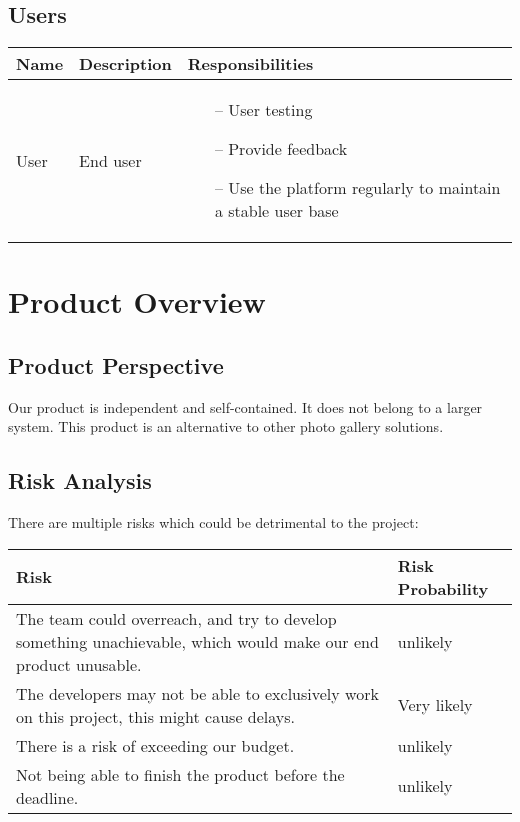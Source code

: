 \documentclass{article}
\begin{document}
\subsection{Users}
\begin{tabularx}{1.0\textwidth} { 
  | >{\raggedright\arraybackslash}X 
  | >{\raggedright\arraybackslash}X
  | >{\raggedright\arraybackslash}X | }
    \hline
    \rowcolor{lightgray} Name & Description & Responsibilities \\
    \hline
    User & End user & \begin{itemize}
        \item[--] User testing
        \item[--] Provide feedback
        \item[--] Use the platform regularly to maintain a stable user base
    \end{itemize}{} \\
    \hline
\end{tabularx}


\section{Product Overview}
\subsection{Product Perspective}
Our product is independent and self-contained. It does not belong to a larger system. This product is an alternative to other photo gallery solutions. 
\subsection{Risk Analysis}
There are multiple risks which could be detrimental to the project: 


\begin{tabularx}{1.0\textwidth} { 
  | >{\raggedright\arraybackslash}X 
  | >{\raggedright\arraybackslash}X | }
    \hline
    \rowcolor{lightgray} Risk & Risk Probability \\
    \hline
    The team could overreach, and try to develop something unachievable, which would make our end product unusable. & unlikely \\
    \hline
    The developers may not be able to exclusively work on this project, this might cause delays. & Very likely \\
    \hline
    There is a risk of exceeding our budget. & unlikely \\
    \hline
    Not being able to finish the product before the deadline. & unlikely \\
    \hline
\end{tabularx}
\end{document}
